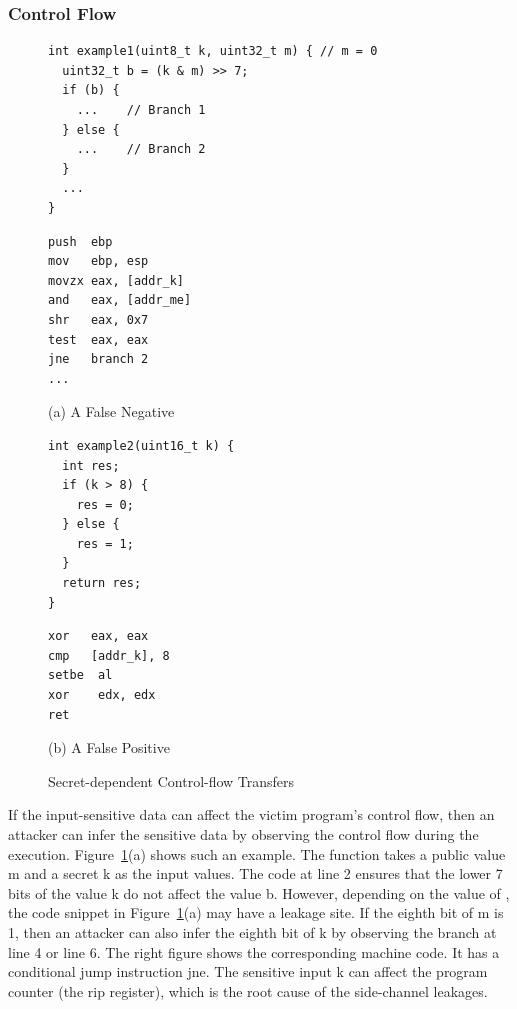 \subsubsection{Control Flow}
\begin{figure}[h]
\begin{minipage}{0.45\linewidth}
\begin{lstlisting}[xleftmargin=.0\textwidth, xrightmargin=.0\textwidth, frame=none]
int example1(uint8_t k, uint32_t m) { // m = 0
  uint32_t b = (k & m) >> 7;
  if (b) {
    ...    // Branch 1
  } else {
    ...    // Branch 2
  }
  ...
}
\end{lstlisting}
\end{minipage}
\hfill
\begin{minipage}{0.45\linewidth}
\begin{lstlisting}[xleftmargin=.0\textwidth, xrightmargin=.00\textwidth, frame=none, numbers=none, mathescape=true]
push  ebp
mov   ebp, esp
movzx eax, [addr_k]    
and   eax, [addr_me] 
shr   eax, 0x7           
test  eax, eax
jne   branch 2
...
\end{lstlisting}
\end{minipage}\caption*{(a) A False Negative}

\begin{minipage}{0.45\linewidth}
\begin{lstlisting}[xleftmargin=.0\textwidth, xrightmargin=.0\textwidth, frame=none]
int example2(uint16_t k) {
  int res;
  if (k > 8) {
    res = 0;
  } else {
    res = 1;
  }
  return res;
}
\end{lstlisting}
\end{minipage}
\hfill
\begin{minipage}{0.45\linewidth}
\begin{lstlisting}[xleftmargin=.0\textwidth, xrightmargin=.00\textwidth, frame=none, numbers=none, mathescape=true]
xor   eax, eax
cmp   [addr_k], 8
setbe  al
xor    edx, edx
ret
\end{lstlisting}
\end{minipage}\caption*{(b) A False Positive}
\caption{Secret-dependent Control-flow Transfers}\label{fig:chapter3:cf}
\end{figure}

If the input-sensitive data can affect the victim program's control flow, then an attacker can infer the sensitive data by observing the control flow during the execution. Figure~\ref{fig:chapter3:cf}(a) shows such an example. The function takes a public value \textsf{m} and a secret \textsf{k} as the input values. The code at line 2 ensures that the lower 7 bits of the value \textsf{k} do not affect the value \textsf{b}. However, depending on the value of , the code snippet in Figure~\ref{fig:chapter3:cf}(a) may have a leakage site. If the eighth bit of \textsf{m} is 1, then an attacker can also infer the eighth bit of \textsf{k} by observing the branch at line 4 or line 6. The right figure shows the corresponding machine code. It has a conditional jump instruction \textsf{jne}. The sensitive input \textsf{k} can affect the program counter (the rip register), which is the root cause of the side-channel leakages. 

